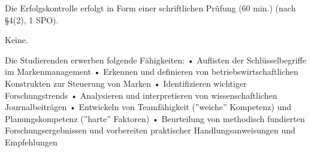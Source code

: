 \begin{course}

\setdoclanguagegerman
{}



\coursehead


\label{cour_4751.dp_997}


\begin{styleenv}
\begin{assessment}
Die Erfolgskontrolle erfolgt in Form einer schriftlichen Prüfung (60 min.) (nach §4(2), 1 SPO).


\end{assessment}

\begin{conditions}Keine.\end{conditions}


\end{styleenv}

\begin{learningoutcomes}
Die Studierenden erwerben folgende Fähigkeiten:\newline
• Auflisten der Schlüsselbegriffe im Markenmanagement\newline
• Erkennen und definieren von betriebswirtschaftlichen Konstrukten zur Steuerung von Marken\newline
• Identifizieren wichtiger Forschungstrends\newline
• Analysieren und interpretieren von wissenschaftlichen Journalbeiträgen\newline
• Entwickeln von Teamfähigkeit (”weiche” Kompetenz) und Planungskompetenz (”harte” Faktoren)\newline
• Beurteilung von methodisch fundierten Forschungsergebnissen und vorbereiten praktischer Handlungsanweisungen und Empfehlungen


\end{learningoutcomes}


\end{course}
